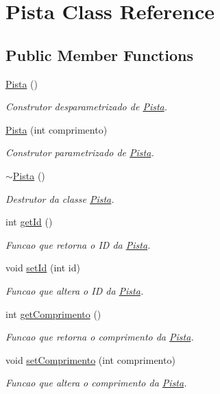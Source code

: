 \hypertarget{classPista}{}\section{Pista Class Reference}
\label{classPista}
\subsection*{Public Member Functions}
\begin{DoxyCompactItemize}
\item 
\hyperlink{classPista_a0ac128160ae609df4adcc5a7a41213ba}{Pista} ()
\begin{DoxyCompactList}\small\item\em Construtor desparametrizado de \hyperlink{classPista}{Pista}. \end{DoxyCompactList}\item 
\hyperlink{classPista_a9ce728f6572e9694bcdc657d7331ca4a}{Pista} (int comprimento)
\begin{DoxyCompactList}\small\item\em Construtor parametrizado de \hyperlink{classPista}{Pista}. \end{DoxyCompactList}\item 
\hyperlink{classPista_ad6f5c470d1ef5976697058ce42ed26bc}{$\sim$\+Pista} ()
\begin{DoxyCompactList}\small\item\em Destrutor da classe \hyperlink{classPista}{Pista}. \end{DoxyCompactList}\item 
int \hyperlink{classPista_ac3e4ec4a2cc6a70a48244a4875fd7633}{get\+Id} ()
\begin{DoxyCompactList}\small\item\em Funcao que retorna o ID da \hyperlink{classPista}{Pista}. \end{DoxyCompactList}\item 
void \hyperlink{classPista_a7700a1ada557bbb77de643848ebb4e08}{set\+Id} (int id)
\begin{DoxyCompactList}\small\item\em Funcao que altera o ID da \hyperlink{classPista}{Pista}. \end{DoxyCompactList}\item 
int \hyperlink{classPista_a138650f65dd855b92bc6fb2482d395cc}{get\+Comprimento} ()
\begin{DoxyCompactList}\small\item\em Funcao que retorna o comprimento da \hyperlink{classPista}{Pista}. \end{DoxyCompactList}\item 
void \hyperlink{classPista_a7ad4b55d2be608f021fd46ece3ce6d91}{set\+Comprimento} (int comprimento)
\begin{DoxyCompactList}\small\item\em Funcao que altera o comprimento da \hyperlink{classPista}{Pista}. \end{DoxyCompactList}\end{DoxyCompactItemize}
